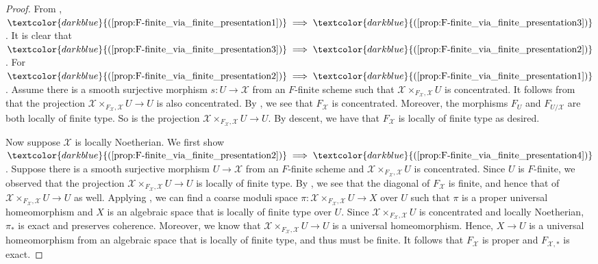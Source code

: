 \documentclass[11pt]{amsart}
\def\eqref#1{\textcolor{darkblue}{(\ref{#1})}}
\theoremstyle{plain}
\theoremstyle{definition}
\numberwithin{equation}{section}
\numberwithin{theorem}{section}
\begin{document}
\begin{proof}
    From , $\eqref{prop:F-finite_via_finite_presentation1} \implies \eqref{prop:F-finite_via_finite_presentation3}$. 
    It is clear that $\eqref{prop:F-finite_via_finite_presentation3} \implies \eqref{prop:F-finite_via_finite_presentation2}$. 
    For $\eqref{prop:F-finite_via_finite_presentation2} \implies \eqref{prop:F-finite_via_finite_presentation1}$. 
    Assume there is a smooth surjective morphism $s\colon U \to \mathcal{X}$ from an $F$-finite scheme such that $\mathcal{X}\times_{F_\mathcal{X},\mathcal{X}} U$ is concentrated. 
    It follows from \cite[Lemma 2.5(4)]{Hall/Rydh:2017} that the projection $\mathcal{X}\times_{F_\mathcal{X},\mathcal{X}} U\to U$ is also concentrated. 
    By \cite[Lemma 2.5(2)]{Hall/Rydh:2017}, we see that $F_\mathcal{X}$ is concentrated. 
    Moreover, the morphisms $F_U$ and $F_{U/\mathcal{X}}$ are both locally of finite type. 
    So is the projection $\mathcal{X}\times_{F_\mathcal{X},\mathcal{X}} U\to U$. 
    By descent, we have that $F_\mathcal{X}$ is locally of finite type as desired.

    Now suppose $\mathcal{X}$ is locally Noetherian. 
    We first show $\eqref{prop:F-finite_via_finite_presentation2} \implies \eqref{prop:F-finite_via_finite_presentation4}$. 
    Suppose there is a smooth surjective morphism $U \to \mathcal{X}$ from an $F$-finite scheme and $\mathcal{X}\times_{F_\mathcal{X},\mathcal{X}} U$ is concentrated. 
    Since $U$ is $F$-finite, we observed that the projection $\mathcal{X}\times_{F_\mathcal{X},\mathcal{X}} U\to U$ is locally of finite type. 
    By , we see that the diagonal of $F_\mathcal{X}$ is finite, and hence that of $\mathcal{X}\times_{F_\mathcal{X},\mathcal{X}} U\to U$ as well. 
    Applying \cite[Theorem 6.12]{Rydh:2013}, we can find a coarse moduli space $\pi\colon \mathcal{X}\times_{F_\mathcal{X},\mathcal{X}} U\to X$ over $U$ such that $\pi$ is a proper universal homeomorphism and $X$ is an algebraic space that is locally of finite type over $U$. 
    Since $\mathcal{X}\times_{F_\mathcal{X},\mathcal{X}} U$ is concentrated and locally Noetherian, $\pi_\ast$ is exact and preserves coherence. 
    Moreover, we know that $\mathcal{X}\times_{F_\mathcal{X},\mathcal{X}} U\to U$ is a universal homeomorphism. 
    Hence, $X\to U$ is a universal homeomorphism from an algebraic space that is locally of finite type, and thus must be finite. 
    It follows that $F_\mathcal{X}$ is proper and $F_{\mathcal{X},\ast}$ is exact.
    

\end{proof}
\end{document}

